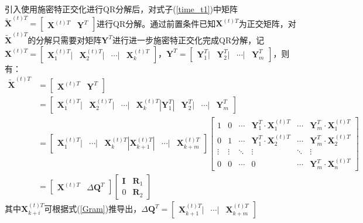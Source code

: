 引入使用施密特正交化进行QR分解后，对式子(\ref{time_t1})中矩阵$\tilde{\textbf{X}}^{(t)T} = \begin{bmatrix} \textbf{X}^{(t)T} & \textbf{Y}^{T}\end{bmatrix}$进行QR分解。通过前置条件已知$\textbf{X}^{(t)T}$为正交矩阵，对$\tilde{\textbf{X}}^{(t)T}$的分解只需要对矩阵$\textbf{Y}^{T}$进行进一步施密特正交化完成QR分解，记$\textbf{X}^{(t)T}=\begin{bmatrix} \textbf{X}^{(t)T}_1 | & \textbf{X}^{(t)T}_2 | & \cdots | & \textbf{X}^{(t)T}_k \end{bmatrix}$，$\textbf{Y}^{T}=\begin{bmatrix} \textbf{Y}^T_1 | & \textbf{Y}^T_2 | & \cdots | & \textbf{Y}^T_m \end{bmatrix}$，则有：
\begin{equation}\label{delta}
\begin{aligned}
\tilde{\textbf{X}}^{(t)T} &= \begin{bmatrix} \textbf{X}^{(t)T} & \textbf{Y}^{T}\end{bmatrix} \\
&=\begin{bmatrix} \textbf{X}^{(t)T}_1 | & \textbf{X}^{(t)T}_2 | & \cdots | & \textbf{X}^{(t)T}_k| \textbf{Y}^T_1 | & \textbf{Y}^T_2 | & \cdots | & \textbf{Y}^T_m \end{bmatrix} \\
&= \begin{bmatrix} \textbf{X}^{(t)T}_1 | & \cdots | & \textbf{X}^{(t)T}_k| \textbf{X}^{(t)T}_{k+1} | &\cdots|& \textbf{X}^{(t)T}_{k+m} \end{bmatrix}
\begin{bmatrix}1 &  0 & \cdots & \textbf{Y}^T_1\cdot\textbf{X}^{(t)T}_{1} & \cdots & \textbf{Y}^T_m\cdot\textbf{X}^{(t)T}_{1}\\
0 & 1  & \cdots & \textbf{Y}^T_1\cdot\textbf{X}^{(t)T}_{2} & \cdots & \textbf{Y}^T_m\cdot\textbf{X}^{(t)T}_{2}\\
\vdots & \vdots & \ddots & \vdots  & \ddots & \vdots \\
0& 0 & \cdots & 0 & \cdots &  \textbf{Y}^T_m\cdot\textbf{X}^{(t)T}_{n}
\end{bmatrix}  \\
&= \begin{bmatrix} \textbf{X}^{(t)T} & \Delta\textbf{Q}^{T} \end{bmatrix}
 \begin{bmatrix} \textbf{I} & \textbf{R}_1 \\
 0 & \textbf{R}_2
 \end{bmatrix}
\end{aligned}
\end{equation}
其中$\textbf{X}^{(t)T}_{k+i}$可根据式(\ref{Gram})推导出，$\Delta\textbf{Q}^{T} =\begin{bmatrix}  \textbf{X}^{(t)T}_{k+1} | &\cdots|& \textbf{X}^{(t)T}_{k+m} \end{bmatrix}$

